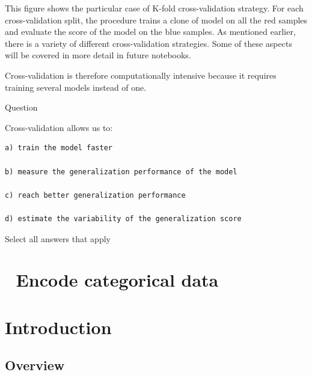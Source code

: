 \documentclass[
  letterpaper,
  DIV=11,
  numbers=noendperiod,
  oneside]{scrreprt}
\begin{document}
\begin{tcolorbox}[enhanced jigsaw, coltitle=black, opacityback=0, title=\textcolor{quarto-callout-note-color}{\faInfo}\hspace{0.5em}{Note}, toprule=.15mm, bottomtitle=1mm, colbacktitle=quarto-callout-note-color!10!white, colframe=quarto-callout-note-color-frame, left=2mm, opacitybacktitle=0.6, bottomrule=.15mm, arc=.35mm, toptitle=1mm, colback=white, titlerule=0mm, breakable, leftrule=.75mm, rightrule=.15mm]

This figure shows the particular case of K-fold cross-validation
strategy. For each cross-validation split, the procedure trains a clone
of model on all the red samples and evaluate the score of the model on
the blue samples. As mentioned earlier, there is a variety of different
cross-validation strategies. Some of these aspects will be covered in
more detail in future notebooks.

\end{tcolorbox}

Cross-validation is therefore computationally intensive because it
requires training several models instead of one.

Question

Cross-validation allows us to:

\begin{verbatim}
a) train the model faster

b) measure the generalization performance of the model

c) reach better generalization performance

d) estimate the variability of the generalization score
\end{verbatim}

Select all answers that apply

\hypertarget{encode-categorical-data}{%
\chapter{\texorpdfstring{{📙} Encode categorical
data}{📙 Encode categorical data}}\label{encode-categorical-data}}

\hypertarget{introduction-17}{%
\chapter{Introduction}\label{introduction-17}}

\hypertarget{overview-10}{%
\section{Overview}\label{overview-10}}
\end{document}
